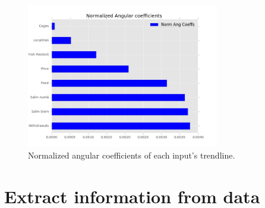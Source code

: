 \begin{figure}[H]
	\centering
    \includegraphics[width=0.75\textwidth]{Files/Norm_Ang_Coeffs.jpg}
    \caption{Normalized angular coefficients of each input's trendline.}
\end{figure}


\newpage
\section{Extract information from data}
